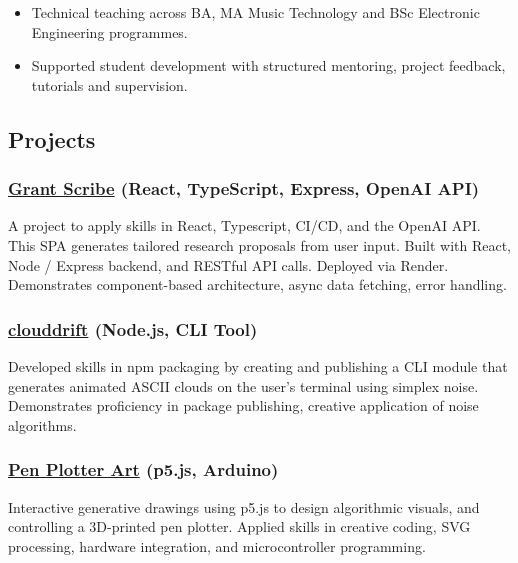 \documentclass[10pt,a4paper]{article}
\providecommand{\tightlist}{%
  \setlength{\itemsep}{0pt}\setlength{\parskip}{0pt}}
\begin{document}
\begin{itemize}
\tightlist
\item
  Technical teaching across BA, MA Music Technology and BSc Electronic
  Engineering programmes.
\item
  Supported student development with structured mentoring, project
  feedback, tutorials and supervision.
\end{itemize}

\subsection{Projects}\label{projects}

\subsubsection{\texorpdfstring{\href{https://granter.onrender.com/}{Grant
Scribe} (React, TypeScript, Express, OpenAI
API)}{Grant Scribe (React, TypeScript, Express, OpenAI API)}}\label{grant-scribe-react-typescript-express-openai-api}

A project to apply skills in React, Typescript, CI/CD, and the OpenAI
API. This SPA generates tailored research proposals from user input.
Built with React, Node / Express backend, and RESTful API calls.
Deployed via Render. Demonstrates component-based architecture, async
data fetching, error handling.

\subsubsection{\texorpdfstring{\href{https://github.com/thrly/clouddrift}{clouddrift}
(Node.js, CLI
Tool)}{clouddrift (Node.js, CLI Tool)}}\label{clouddrift-node.js-cli-tool}

Developed skills in npm packaging by creating and publishing a CLI
module that generates animated ASCII clouds on the user's terminal using
simplex noise. Demonstrates proficiency in package publishing, creative
application of noise algorithms.

\subsubsection{\texorpdfstring{\href{https://github.com/thrly/pen-plotter-resources}{Pen
Plotter Art} (p5.js,
Arduino)}{Pen Plotter Art (p5.js, Arduino)}}\label{pen-plotter-art-p5.js-arduino}

Interactive generative drawings using p5.js to design algorithmic
visuals, and controlling a 3D-printed pen plotter. Applied skills in
creative coding, SVG processing, hardware integration, and
microcontroller programming.
\end{document}
